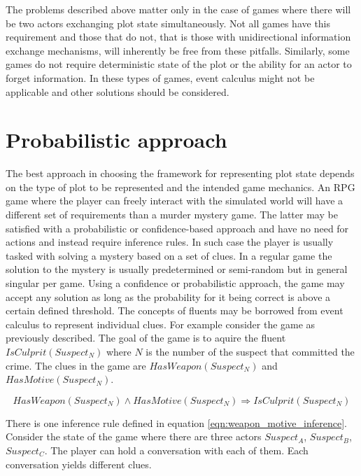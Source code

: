 The problems described above matter only in the case of games where there will be two actors exchanging plot state simultaneously.
Not all games have this requirement and those that do not, that is those with unidirectional information exchange mechanisms, will inherently be free from these pitfalls.
Similarly, some games do not require deterministic state of the plot or the ability for an actor to forget information.
In these types of games, event calculus might not be applicable and other solutions should be considered.

\section {Probabilistic approach}

The best approach in choosing the framework for representing plot state depends on the type of plot to be represented and the intended game mechanics.
An RPG game where the player can freely interact with the simulated world will have a different set of requirements than a murder mystery game.
The latter may be satisfied with a probabilistic or confidence-based approach and have no need for actions and instead require inference rules.
In such case the player is usually tasked with solving a mystery based on a set of clues.
In a regular game the solution to the mystery is usually predetermined or semi-random but in general singular per game.
Using a confidence or probabilistic approach, the game may accept any solution as long as the probability for it being correct is above a certain defined threshold.
The concepts of fluents may be borrowed from event calculus to represent individual clues.
For example consider the game as previously described.
The goal of the game is to aquire the fluent $IsCulprit \left( Suspect_N \right)$ where $N$ is the number of the suspect that committed the crime.
The clues in the game are $HasWeapon \left( Suspect_N \right)$ and $HasMotive \left( Suspect_N \right)$.

\begin{equation}
    \label{eqn:weapon_motive_inference}
    HasWeapon \left( Suspect_N \right) \land HasMotive \left( Suspect_N \right) \Rightarrow  IsCulprit \left( Suspect_N \right)
\end{equation}

There is one inference rule defined in equation \ref{eqn:weapon_motive_inference}.
Consider the state of the game where there are three actors $Suspect_A$, $Suspect_B$, $Suspect_C$.
The player can hold a conversation with each of them.
Each conversation yields different clues.

